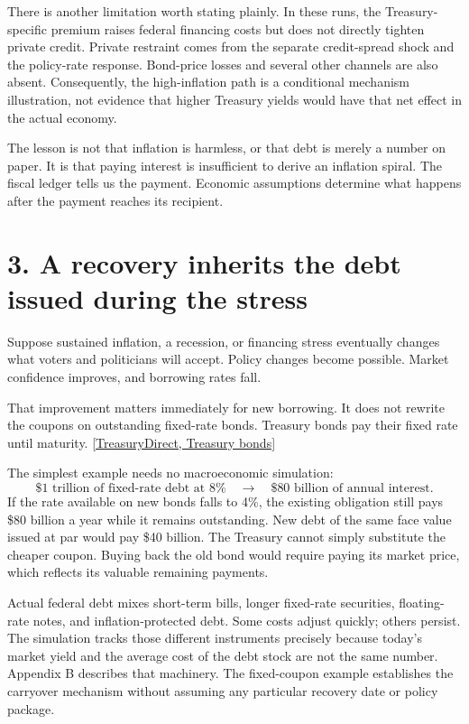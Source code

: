 \documentclass[11pt,letterpaper]{article}
\newcommand{\src}[2]{\href{#1}{#2}}
\begin{document}
There is another limitation worth stating plainly. In these runs, the
Treasury-specific premium raises federal financing costs but does not directly
tighten private credit. Private restraint comes from the separate credit-spread
shock and the policy-rate response. Bond-price losses and several other
channels are also absent. Consequently, the high-inflation path is a
conditional mechanism illustration, not evidence that higher Treasury yields
would have that net effect in the actual economy.

The lesson is not that inflation is harmless, or that debt is merely a number
on paper. It is that paying interest is insufficient to derive an inflation
spiral. The fiscal ledger tells us the payment. Economic assumptions determine
what happens after the payment reaches its recipient.

\section*{3. A recovery inherits the debt issued during the stress}

Suppose sustained inflation, a recession, or financing stress eventually
changes what voters and politicians will accept. Policy changes become
possible. Market confidence improves, and borrowing rates fall.

That improvement matters immediately for new borrowing. It does not rewrite
the coupons on outstanding fixed-rate bonds. Treasury bonds pay their fixed
rate until maturity.
\src{https://www.treasurydirect.gov/marketable-securities/treasury-bonds/}
{[TreasuryDirect, Treasury bonds]}

The simplest example needs no macroeconomic simulation:
\[
 \$1\text{ trillion of fixed-rate debt at }8\%
 \quad\longrightarrow\quad \$80\text{ billion of annual interest}.
\]
If the rate available on new bonds falls to 4\%, the existing obligation still
pays \$80 billion a year while it remains outstanding. New debt of the same
face value issued at par would pay \$40 billion. The Treasury cannot simply
substitute the cheaper coupon. Buying back the old bond would require paying
its market price, which reflects its valuable remaining payments.

Actual federal debt mixes short-term bills, longer fixed-rate securities,
floating-rate notes, and inflation-protected debt. Some costs adjust quickly;
others persist. The simulation tracks those different instruments precisely
because today's market yield and the average cost of the debt stock are not
the same number. Appendix B describes that machinery. The fixed-coupon example
establishes the carryover mechanism without assuming any particular recovery
date or policy package.
\end{document}
